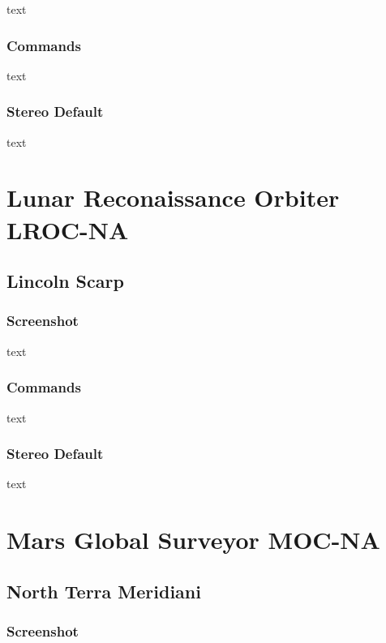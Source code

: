 text

\subsubsection*{Commands}

text

\subsubsection*{Stereo Default}

text

\section{Lunar Reconaissance Orbiter LROC-NA}

\subsection{Lincoln Scarp}

\subsubsection*{Screenshot}

text

\subsubsection*{Commands}

text

\subsubsection*{Stereo Default}

text

\section{Mars Global Surveyor MOC-NA}

\subsection{North Terra Meridiani}

\subsubsection*{Screenshot}

